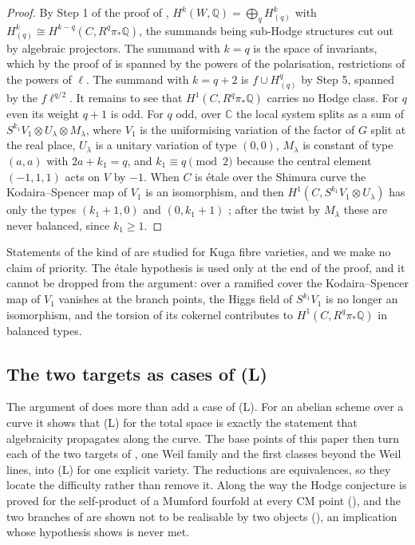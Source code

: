\documentclass[11pt,reqno]{amsart}
\theoremstyle{plain}
\theoremstyle{definition}
\theoremstyle{remark}
\newcommand{\QQ}{\mathbb{Q}}
\newcommand{\CC}{\mathbb{C}}
\begin{document}
\begin{proof}
By Step 1 of the proof of ,
$H^{k}(W,\QQ)=\bigoplus_{q}H^{k}_{(q)}$ with $H^{k}_{(q)}\cong
H^{k-q}(C,R^{q}\pi_{*}\QQ)$, the summands being sub-Hodge structures cut out by
algebraic projectors. The summand with $k=q$ is the space of invariants, which
by the proof of  is spanned by the powers of the
polarisation, restrictions of the powers of $\ell$. The summand with $k=q+2$
is $f\cup H^{q}_{(q)}$ by Step 5, spanned by the $f\ell^{q/2}$. It remains to
see that $H^{1}(C,R^{q}\pi_{*}\QQ)$ carries no Hodge class. For $q$ even its
weight $q+1$ is odd. For $q$ odd, over $\CC$ the local system splits as a sum
of $S^{k_{1}}V_{1}\otimes U_{\lambda}\otimes M_{\lambda}$, where $V_{1}$ is the
uniformising variation of the factor of $G$ split at the real place, $U_{\lambda}$ is
a unitary variation of type $(0,0)$, $M_{\lambda}$ is constant of type $(a,a)$
with $2a+k_{1}=q$, and $k_{1}\equiv q\pmod2$ because the central element
$(-1,1,1)$ acts on $V$ by $-1$. When $C$ is \'etale over the Shimura curve the
Kodaira--Spencer map of $V_{1}$ is an isomorphism, and then
$H^{1}(C,S^{k_{1}}V_{1}\otimes U_{\lambda})$ has only the types $(k_{1}+1,0)$
and $(0,k_{1}+1)$ \cite{Zuc79}; after the twist by $M_{\lambda}$ these are
never balanced, since $k_{1}\ge1$.
\end{proof}

Statements of the kind of  are studied for Kuga
fibre varieties, and we make no claim of priority.
The \'etale hypothesis is used only at the end of the proof, and it cannot be
dropped from the argument: over a ramified cover the Kodaira--Spencer map of
$V_{1}$ vanishes at the branch points, the Higgs field of $S^{k_{1}}V_{1}$ is
no longer an isomorphism, and the torsion of its cokernel contributes to
$H^{1}(C,R^{q}\pi_{*}\QQ)$ in balanced types.

\subsection{The two targets as cases of (L)}
\label{ssec:targets}

The argument of  does more than add a case of
\textup{(L)}. For an abelian scheme over a curve it shows that \textup{(L)}
for the total space is exactly the statement that algebraicity propagates
along the curve. The base points of this paper then turn each of the two
targets of , one Weil family and the first
classes beyond the Weil lines, into \textup{(L)} for one explicit variety. The
reductions are equivalences, so they locate the difficulty rather than remove
it. Along the way the Hodge conjecture is proved for the self-product of a
Mumford fourfold at every CM point (), and the two
branches of \cite[Remark~2.10]{paperII} are shown not to be realisable by two
objects (), an implication whose hypothesis
\cite[Theorem~3.5]{paperII} shows is never met.
\end{document}
